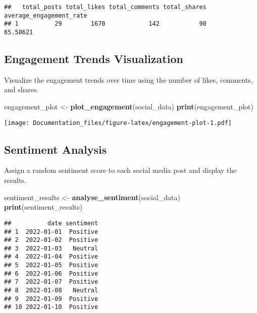 \documentclass[
]{article}
\newenvironment{Shaded}{\begin{snugshade}}{\end{snugshade}}
\newcommand{\FunctionTok}[1]{\textcolor[rgb]{0.13,0.29,0.53}{\textbf{#1}}}
\newcommand{\NormalTok}[1]{#1}
\newcommand{\OtherTok}[1]{\textcolor[rgb]{0.56,0.35,0.01}{#1}}
\begin{document}
\begin{verbatim}
##   total_posts total_likes total_comments total_shares average_engagement_rate
## 1          29        1670            142           90                65.58621
\end{verbatim}

\hypertarget{engagement-trends-visualization}{%
\subsection{Engagement Trends
Visualization}\label{engagement-trends-visualization}}

Visualize the engagement trends over time using the number of likes,
comments, and shares.

\begin{Shaded}
\begin{Highlighting}[]
\NormalTok{engagement\_plot }\OtherTok{\textless{}{-}} \FunctionTok{plot\_engagement}\NormalTok{(social\_data)}
\FunctionTok{print}\NormalTok{(engagement\_plot)}
\end{Highlighting}
\end{Shaded}

\texttt{[image: Documentation\_files/figure-latex/engagement-plot-1.pdf]}

\hypertarget{sentiment-analysis}{%
\subsection{Sentiment Analysis}\label{sentiment-analysis}}

Assign a random sentiment score to each social media post and display
the results.

\begin{Shaded}
\begin{Highlighting}[]
\NormalTok{sentiment\_results }\OtherTok{\textless{}{-}} \FunctionTok{analyse\_sentiment}\NormalTok{(social\_data)}
\FunctionTok{print}\NormalTok{(sentiment\_results)}
\end{Highlighting}
\end{Shaded}

\begin{verbatim}
##          date sentiment
## 1  2022-01-01  Positive
## 2  2022-01-02  Positive
## 3  2022-01-03   Neutral
## 4  2022-01-04  Positive
## 5  2022-01-05  Positive
## 6  2022-01-06  Positive
## 7  2022-01-07  Positive
## 8  2022-01-08   Neutral
## 9  2022-01-09  Positive
## 10 2022-01-10  Positive
\end{verbatim}
\end{document}
